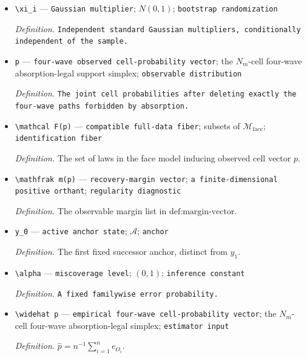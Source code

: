 \documentclass{article}
\begin{document}
\begin{itemize}
  \par\smallskip\noindent\emph{Definition.} The second fixed predecessor anchor, distinct from \(x_0\).
  \item \texttt{\textbackslash{}\allowbreak{}xi\_\allowbreak{}i} --- \texttt{Gaussian multiplier}; \(N(0,1)\); \texttt{bootstrap randomization}
  \par\smallskip\noindent\emph{Definition.} \texttt{Independent standard Gaussian multipliers,\allowbreak{} conditionally independent of the sample.}
  \item \texttt{p} --- \texttt{four-\allowbreak{}wave observed cell-\allowbreak{}probability vector}; the \(N_m\)-cell four-wave absorption-legal support simplex; \texttt{observable distribution}
  \par\smallskip\noindent\emph{Definition.} \texttt{The joint cell probabilities after deleting exactly the four-\allowbreak{}wave paths forbidden by absorption.}
  \item \texttt{\textbackslash{}\allowbreak{}mathcal F(p)} --- \texttt{compatible full-\allowbreak{}data fiber}; subsets of \(\mathcal M_{\mathrm{face}}\); \texttt{identification fiber}
  \par\smallskip\noindent\emph{Definition.} The set of laws in the face model inducing observed cell vector \(p\).
  \item \texttt{\textbackslash{}\allowbreak{}mathfrak m(p)} --- \texttt{recovery-\allowbreak{}margin vector}; \texttt{a finite-\allowbreak{}dimensional positive orthant}; \texttt{regularity diagnostic}
  \par\smallskip\noindent\emph{Definition.} The observable margin list in \(\text{def:margin-vector}\).
  \item \texttt{y\_\allowbreak{}0} --- \texttt{active anchor state}; \(\mathcal A\); \texttt{anchor}
  \par\smallskip\noindent\emph{Definition.} The first fixed successor anchor, distinct from \(y_1\).
  \item \texttt{\textbackslash{}\allowbreak{}alpha} --- \texttt{miscoverage level}; \((0,1)\); \texttt{inference constant}
  \par\smallskip\noindent\emph{Definition.} \texttt{A fixed familywise error probability.}
  \item \texttt{\textbackslash{}\allowbreak{}widehat p} --- \texttt{empirical four-\allowbreak{}wave cell-\allowbreak{}probability vector}; the \(N_m\)-cell four-wave absorption-legal simplex; \texttt{estimator input}
  \par\smallskip\noindent\emph{Definition.} \(\widehat p=n^{-1}\sum_{i=1}^n e_{O_i}\).

\end{itemize}
\end{document}
